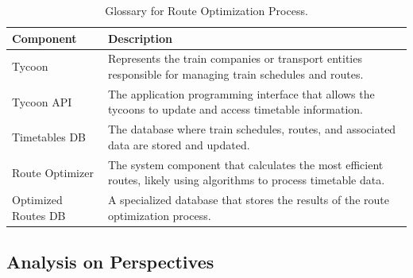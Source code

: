 \begin{table}[H]
    \centering
    \caption{Glossary for Route Optimization Process.}
    \label{tab:route_optimization_glossary}
    \begin{tabularx}{\textwidth}{@{}lX@{}} %
    \toprule
    \textbf{Component} & \textbf{Description} \\
    \midrule
    Tycoon & Represents the train companies or transport entities responsible for managing train schedules and routes. \\
    Tycoon API & The application programming interface that allows the tycoons to update and access timetable information. \\
    Timetables DB & The database where train schedules, routes, and associated data are stored and updated. \\
    Route Optimizer & The system component that calculates the most efficient routes, likely using algorithms to process timetable data. \\
    Optimized Routes DB & A specialized database that stores the results of the route optimization process. \\
    \bottomrule
    \end{tabularx}
\end{table}

\subsection{Analysis on Perspectives}
\begin{table}[h!]
    \centering
    \caption{Concurrency View Prioritized Quality Attributes}
    \label{tab:concurrency_view}
\end{table}

